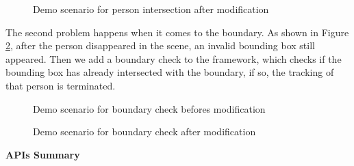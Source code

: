\begin{figure}[H]
  \centering
  \caption{Demo scenario for person intersection after modification}
  \label{fig:person_intersec_mod}
\end{figure} 

The second problem happens when it comes to the boundary. As shown in Figure \ref{fig:boundary_check}, after the person disappeared in the scene, an invalid bounding box still appeared. Then we add a boundary check to the framework, which checks if the bounding box has already intersected with the boundary, if so, the tracking of that person is terminated. 

\begin{figure}[H]
  \centering
  \caption{Demo scenario for boundary check befores modification}
  \label{fig:boundary_check}
\end{figure} 

\begin{figure}[H]
  \centering
  \caption{Demo scenario for boundary check after modification}
  \label{fig:boundary_check_mod}
\end{figure} 

\textbf{APIs Summary}

